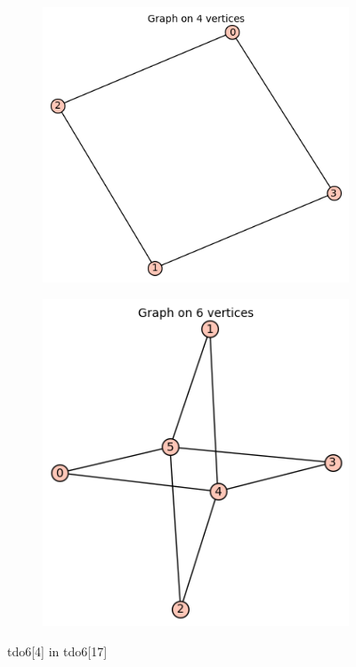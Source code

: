 \documentclass[12pt, a4paper]{article}
\begin{document}
\begin{center}
\begin{figure}[!htb]
\centering
\begin{subfigure}{0.5\textwidth}
  \centering
  \includegraphics[width=0.5\linewidth]{tdo6[4]}
\end{subfigure}%
\begin{subfigure}{0.5\textwidth}
  \centering
  \includegraphics[width=0.5\linewidth]{tdo6[17]}
\end{subfigure}
\caption{tdo6[4] in tdo6[17]}
\label{fig:test}
\end{figure}


\end{center}
\end{document}
